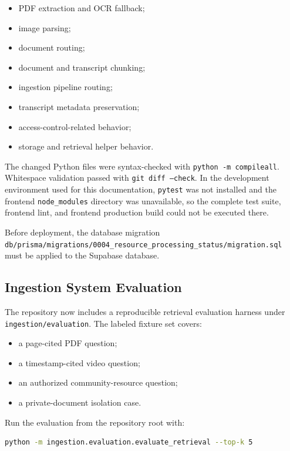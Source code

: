 \documentclass[11pt,a4paper]{article}
\begin{document}
\begin{itemize}[leftmargin=*]
  \item PDF extraction and OCR fallback;
  \item image parsing;
  \item document routing;
  \item document and transcript chunking;
  \item ingestion pipeline routing;
  \item transcript metadata preservation;
  \item access-control-related behavior;
  \item storage and retrieval helper behavior.
\end{itemize}

The changed Python files were syntax-checked with
\texttt{python -m compileall}. Whitespace validation passed with
\texttt{git diff --check}. In the development environment used for this
documentation, \texttt{pytest} was not installed and the frontend
\texttt{node\_modules} directory was unavailable, so the complete test suite,
frontend lint, and frontend production build could not be executed there.

Before deployment, the database migration
\texttt{db/prisma/migrations/0004\_resource\_processing\_status/migration.sql}
must be applied to the Supabase database.

\subsection{Ingestion System Evaluation}

The repository now includes a reproducible retrieval evaluation harness under
\texttt{ingestion/evaluation}. The labeled fixture set covers:

\begin{itemize}[leftmargin=*]
  \item a page-cited PDF question;
  \item a timestamp-cited video question;
  \item an authorized community-resource question;
  \item a private-document isolation case.
\end{itemize}

Run the evaluation from the repository root with:

\begin{lstlisting}[language=bash]
python -m ingestion.evaluation.evaluate_retrieval --top-k 5
\end{lstlisting}
\end{document}
